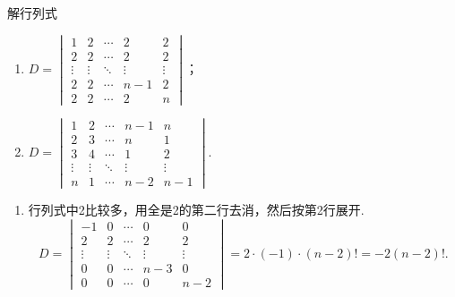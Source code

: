 \begin{exercise}
\begin{exgroup}
        \item 解行列式
        \begin{enumerate}
            \item $D=\begin{vmatrix}
                          1      & 2      & \cdots & 2      & 2      \\
                          2      & 2      & \cdots & 2      & 2      \\
                          \vdots & \vdots & \ddots & \vdots & \vdots \\
                          2      & 2      & \cdots & n-1    & 2      \\
                          2      & 2      & \cdots & 2      & n\end{vmatrix}$；

            \item $D=\begin{vmatrix}
                          1      & 2      & \cdots & n-1    & n      \\
                          2      & 3      & \cdots & n      & 1      \\
                          3      & 4      & \cdots & 1      & 2      \\
                          \vdots & \vdots & \ddots & \vdots & \vdots \\
                          n      & 1      & \cdots & n-2    & n-1
                      \end{vmatrix}$.
        \end{enumerate}
        \begin{answer}
            \begin{enumerate}
                \item 行列式中2比较多，用全是2的第二行去消，然后按第2行展开.
                      \[D=\begin{vmatrix}
                              -1     & 0      & \cdots & 0      & 0      \\
                              2      & 2      & \cdots & 2      & 2      \\
                              \vdots & \vdots & \ddots & \vdots & \vdots \\
                              0      & 0      & \cdots & n-3    & 0      \\
                              0      & 0      & \cdots & 0      & n-2
                          \end{vmatrix}=2\cdot(-1)\cdot(n-2)!=-2(n-2)!.\]


\end{enumerate}
\end{answer}
\end{exgroup}
\end{exercise}

